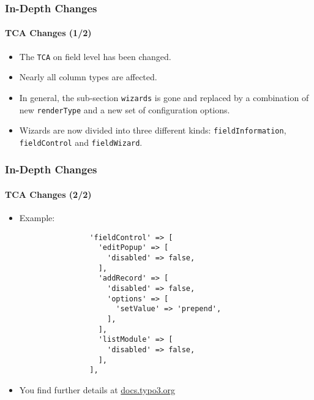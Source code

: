 
\begin{frame}[fragile]
	\frametitle{In-Depth Changes}
	\framesubtitle{TCA Changes (1/2)}

	\begin{itemize}

		\item The \texttt{TCA} on field level has been changed.

		\item Nearly all column types are affected.

		\item In general, the sub-section \texttt{wizards} is gone and replaced by a combination of new
			\texttt{renderType} and a new set of configuration options.

		\item Wizards are now divided into three different kinds: \texttt{fieldInformation}, \texttt{fieldControl}
			and \texttt{fieldWizard}.

	\end{itemize}

\end{frame}

\begin{frame}[fragile]
	\frametitle{In-Depth Changes}
	\framesubtitle{TCA Changes (2/2)}

	\lstset{basicstyle=\tiny\ttfamily}

	\begin{itemize}
		\item Example:

			\begin{lstlisting}
				'fieldControl' => [
				  'editPopup' => [
				    'disabled' => false,
				  ],
				  'addRecord' => [
				    'disabled' => false,
				    'options' => [
				      'setValue' => 'prepend',
				    ],
				  ],
				  'listModule' => [
				    'disabled' => false,
				  ],
				],
			\end{lstlisting}

		\item You find further details at
			\href{https://docs.typo3.org/typo3cms/extensions/core/8-dev/singlehtml/Index.html#deprecation-79440-formengine-element-expansion}{docs.typo3.org}

	\end{itemize}

\end{frame}


